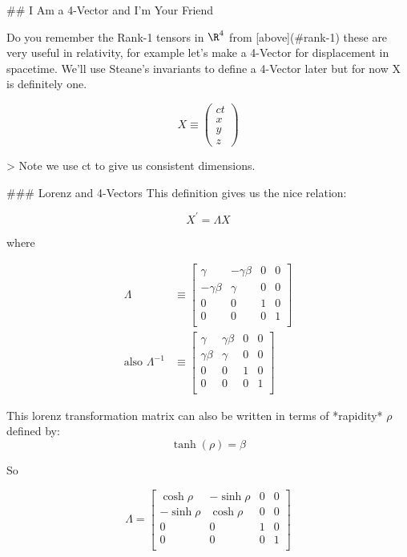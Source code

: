 ## I Am a 4-Vector and I'm Your Friend

Do you remember the Rank-1 tensors in $\R^4$ from [above](#rank-1) these are very useful in relativity, for example let's make a 4-Vector for displacement in spacetime. We'll use Steane's invariants to define a 4-Vector later but for now X is definitely one.

$$
X\equiv
\begin{pmatrix}
    ct\\
    x\\
    y\\
    z
\end{pmatrix}
$$

> Note we use ct to give us consistent dimensions.


### Lorenz and 4-Vectors
This definition gives us the nice relation:

$$
X^\prime = \Lambda X
$$

where

$$
\begin{aligned}
\Lambda&\equiv 
\begin{bmatrix}
    \gamma & -\gamma\beta  & 0 & 0\\
    -\gamma\beta & \gamma & 0 & 0\\
    0            & 0      & 1 & 0\\ 
    0            & 0      & 0 & 1\\ 
\end{bmatrix}\\
\text{also }
\Lambda^{-1}&\equiv 
\begin{bmatrix}
    \gamma & \gamma\beta  & 0 & 0\\
    \gamma\beta & \gamma & 0 & 0\\
    0            & 0      & 1 & 0\\ 
    0            & 0      & 0 & 1\\ 
\end{bmatrix}
\end{aligned}
$$

This lorenz transformation matrix can also be written in terms of *rapidity* $\rho$ defined by:
$$
\tanh{(\rho)} = \beta
$$

So

$$
\Lambda=
\begin{bmatrix}
    \cosh\rho & -\sinh\rho  & 0 & 0\\
    -\sinh\rho & \cosh\rho & 0 & 0\\
    0            & 0      & 1 & 0\\ 
    0            & 0      & 0 & 1\\ 
\end{bmatrix}
$$

